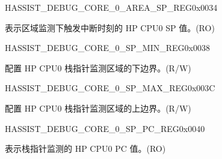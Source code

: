 \begin{register}{H}{ASSIST\_DEBUG\_CORE\_0\_AREA\_SP\_REG}{0x0034}\label{regdesc:ASSISTDEBUGCORE0AREASPREG}
%
\regnewline%
\begin{regdesc}\begin{reglist}
\label{fielddesc:ASSISTDEBUGCORE0AREASP}\item [ASSIST\_DEBUG\_CORE\_0\_AREA\_SP] 表示区域监测下触发中断时刻的 HP CPU0 SP 值。(RO)
\end{reglist}\end{regdesc}
\end{register}


\begin{register}{H}{ASSIST\_DEBUG\_CORE\_0\_SP\_MIN\_REG}{0x0038}\label{regdesc:ASSISTDEBUGCORE0SPMINREG}
%
\regnewline%
\begin{regdesc}\begin{reglist}
\label{fielddesc:ASSISTDEBUGCORE0SPMIN}\item [ASSIST\_DEBUG\_CORE\_0\_SP\_MIN] 配置 HP CPU0 栈指针监测区域的下边界。(R/W)
\end{reglist}\end{regdesc}
\end{register}


\begin{register}{H}{ASSIST\_DEBUG\_CORE\_0\_SP\_MAX\_REG}{0x003C}\label{regdesc:ASSISTDEBUGCORE0SPMAXREG}
%
\regnewline%
\begin{regdesc}\begin{reglist}
\label{fielddesc:ASSISTDEBUGCORE0SPMAX}\item [ASSIST\_DEBUG\_CORE\_0\_SP\_MAX] 配置 HP CPU0 栈指针监测区域的上边界。(R/W)
\end{reglist}\end{regdesc}
\end{register}


\begin{register}{H}{ASSIST\_DEBUG\_CORE\_0\_SP\_PC\_REG}{0x0040}\label{regdesc:ASSISTDEBUGCORE0SPPCREG}
%
\regnewline%
\begin{regdesc}\begin{reglist}
\label{fielddesc:ASSISTDEBUGCORE0SPPC}\item [ASSIST\_DEBUG\_CORE\_0\_SP\_PC] 表示栈指针监测的 HP CPU0 PC 值。(RO)
\end{reglist}\end{regdesc}
\end{register}


